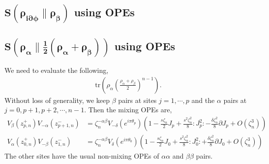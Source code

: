 \documentclass[11pt]{article}
\newcommand{\p}{\partial}
\newcommand{\lb}{\left(}
\newcommand{\rb}{\right)}
\begin{document}
\subsection{\texorpdfstring{$\boldsymbol{S\lb\rho_{i\p \phi} \| \rho_\beta\rb }$ using OPEs}{S(rho  i del phi wrt rho0 using OPEs}}


\subsection{\texorpdfstring{$\boldsymbol{S\lb\rho_\alpha \| \frac{1}{2}\lb \rho_\alpha + \rho_\beta\rb\rb }$ using OPEs}{S(rho alpha plus half rho alpha plus half rho beta) using OPEs}}\label{appendix rho alpha wrt averaged binary mixture}
We need to evaluate the following,
\begin{align}
    \text{tr}\lb \rho_\alpha \lb\frac{ \rho_\alpha + \rho_\beta}{2}\rb^{n-1}\rb. 
\end{align}
Without loss of generality, we keep $\beta$ pairs at sites $j = 1,\cdots, p$ and the $\alpha$ pairs at $j = 0,p+1,p+2,\cdots, n-1$. Then the mixing OPEs are,
\begin{align}
    V_\beta(z_{p,n}^+) V_{-\alpha}(z_{p+1,n}^-) &= \zeta_n^{-\alpha\beta} V_{-\delta}(e^{i\pi \theta_{p}}) \lb 1- \frac{s\zeta_n}{2}J_{p} + \frac{s^2 \zeta_n^2}{8}:J_{p}^2: - \frac{\delta\zeta_n^2}{8}\p J_{p} + O(\zeta_n^3)  \rb \\
    V_\alpha(z_{0,n}^+) V_{-\beta}(z_{1,n}^-) &= \zeta_n^{-\alpha\beta} V_{\delta}(e^{i\pi \theta_{0}}) \lb 1- \frac{s\zeta_n}{2}J_{0} + \frac{s^2 \zeta_n^2}{8}:J_{0}^2: + \frac{\delta\zeta_n^2}{8}\p J_{0} + O(\zeta_n^3)  \rb
\end{align}
The other sites have the usual non-mixing OPEs of $\alpha\alpha$ and $\beta\beta$ pairs. 
\end{document}
